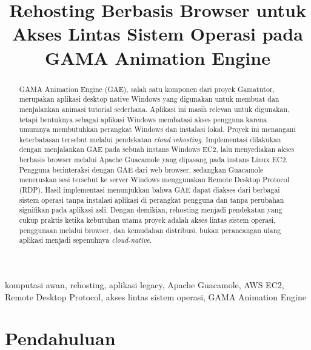 \documentclass[conference]{IEEEtran}
\begin{document}
\title{Rehosting Berbasis Browser untuk Akses Lintas Sistem Operasi pada GAMA Animation Engine}

\author{
}

\maketitle

\begin{abstract}
GAMA Animation Engine (GAE), salah satu komponen dari proyek Gamatutor, merupakan aplikasi desktop native Windows yang digunakan untuk membuat dan menjalankan animasi tutorial sederhana. Aplikasi ini masih relevan untuk digunakan, tetapi bentuknya sebagai aplikasi Windows membatasi akses pengguna karena umumnya membutuhkan perangkat Windows dan instalasi lokal. Proyek ini menangani keterbatasan tersebut melalui pendekatan \textit{cloud rehosting}. Implementasi dilakukan dengan menjalankan GAE pada sebuah instans Windows EC2, lalu menyediakan akses berbasis browser melalui Apache Guacamole yang dipasang pada instans Linux EC2. Pengguna berinteraksi dengan GAE dari web browser, sedangkan Guacamole meneruskan sesi tersebut ke server Windows menggunakan Remote Desktop Protocol (RDP). Hasil implementasi menunjukkan bahwa GAE dapat diakses dari berbagai sistem operasi tanpa instalasi aplikasi di perangkat pengguna dan tanpa perubahan signifikan pada aplikasi asli. Dengan demikian, rehosting menjadi pendekatan yang cukup praktis ketika kebutuhan utama proyek adalah akses lintas sistem operasi, penggunaan melalui browser, dan kemudahan distribusi, bukan perancangan ulang aplikasi menjadi sepenuhnya \textit{cloud-native}.
\end{abstract}

\begin{IEEEkeywords}
komputasi awan, rehosting, aplikasi legacy, Apache Guacamole, AWS EC2, Remote Desktop Protocol, akses lintas sistem operasi, GAMA Animation Engine
\end{IEEEkeywords}

\section{Pendahuluan}
\end{document}
